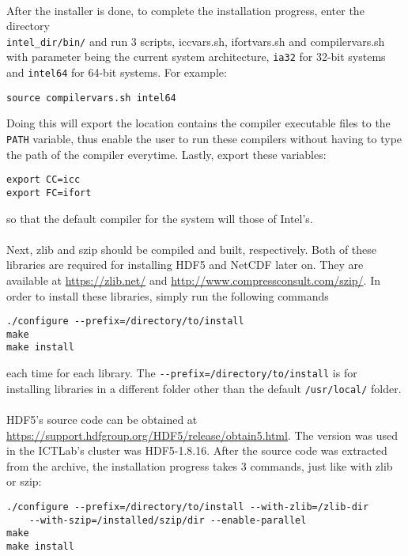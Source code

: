 ~\\
After the installer is done, to complete the installation progress, enter the directory \\ \verb|intel_dir/bin/| and run 3 scripts, iccvars.sh, ifortvars.sh and compilervars.sh with parameter being the current system architecture, \verb|ia32| for 32-bit systems and \verb|intel64| for 64-bit systems. For example: 
\begin{center}
\begin{BVerbatim}
source compilervars.sh intel64
\end{BVerbatim}
\end{center}
Doing this will export the location contains the compiler executable files to the \verb|PATH| variable, thus enable the user to run these compilers without having to type the path of the compiler everytime. Lastly, export these variables: \\
\begin{center}
\begin{BVerbatim}
export CC=icc
export FC=ifort
\end{BVerbatim}
\end{center}
so that the default compiler for the system will those of Intel's. \\
~\\
Next, zlib and szip should be compiled and built, respectively. Both of these libraries are required for installing HDF5 and NetCDF later on. They are available at \url{https://zlib.net/} and \url{http://www.compressconsult.com/szip/}. In order to install these libraries, simply run the following commands
\begin{center}
\begin{BVerbatim}
./configure --prefix=/directory/to/install
make
make install
\end{BVerbatim}
\end{center}
each time for each library. The \verb|--prefix=/directory/to/install| is for installing libraries in a different folder other than the default \verb|/usr/local/| folder. \\
~\\
HDF5's source code can be obtained at \url{https://support.hdfgroup.org/HDF5/release/obtain5.html}. The version was used in the ICTLab's cluster was HDF5-1.8.16. After the source code was extracted from the archive, the installation progress takes 3 commands, just like with zlib or szip:
\begin{center}
\begin{BVerbatim}
./configure --prefix=/directory/to/install --with-zlib=/zlib-dir
	--with-szip=/installed/szip/dir --enable-parallel
make
make install
\end{BVerbatim}
\end{center}
